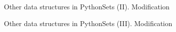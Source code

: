 \documentclass[10pt,compress]{beamer} %
\begin{document}
	

%		

\begin{frame}{Other data structures in Python}{Sets (II). Modification}
 	  
 	   \tiny{
		\begin{block}{}
		
		\vspace{-0.2cm}
		
		\vspace{-0.2cm}
		
		\end{block}
   }
\end{frame}

\begin{frame}[plain]{Other data structures in Python}{Sets (III). Modification}
 	\vspace{-0.24cm}  
 	   \tiny{
		\begin{block}{}
		
		\vspace{-0.2cm}
		
		\vspace{-0.2cm}
		
		\end{block}
   }
\end{frame}
\end{document}
